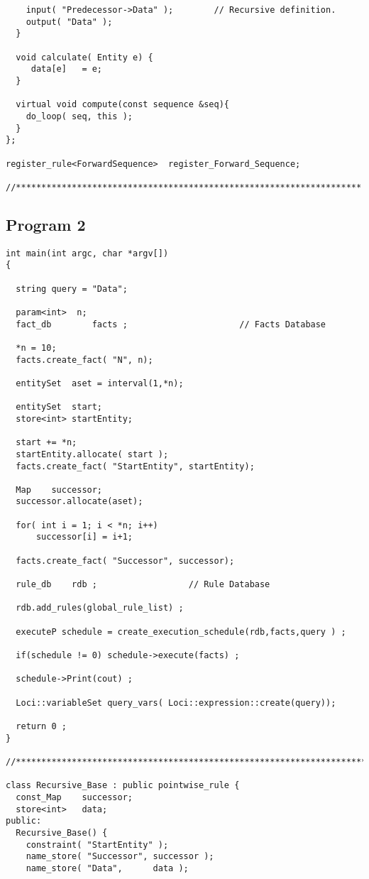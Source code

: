 \begin{verbatim}
    input( "Predecessor->Data" );        // Recursive definition.
    output( "Data" );
  }

  void calculate( Entity e) {
     data[e]   = e;
  }

  virtual void compute(const sequence &seq){
    do_loop( seq, this );
  }
};

register_rule<ForwardSequence>  register_Forward_Sequence;

//********************************************************************
\end{verbatim}

\subsection { Program 2 }

\begin{verbatim}
int main(int argc, char *argv[]) 
{
  
  string query = "Data";

  param<int>  n;
  fact_db        facts ;                      // Facts Database
  
  *n = 10;
  facts.create_fact( "N", n);

  entitySet  aset = interval(1,*n);

  entitySet  start;
  store<int> startEntity;

  start += *n;
  startEntity.allocate( start );
  facts.create_fact( "StartEntity", startEntity);

  Map    successor;
  successor.allocate(aset);

  for( int i = 1; i < *n; i++)
      successor[i] = i+1;

  facts.create_fact( "Successor", successor);

  rule_db    rdb ;                  // Rule Database
  
  rdb.add_rules(global_rule_list) ;

  executeP schedule = create_execution_schedule(rdb,facts,query ) ;

  if(schedule != 0) schedule->execute(facts) ;

  schedule->Print(cout) ;
  
  Loci::variableSet query_vars( Loci::expression::create(query));
  
  return 0 ;
}

//*********************************************************************

class Recursive_Base : public pointwise_rule {
  const_Map    successor;
  store<int>   data;
public:
  Recursive_Base() {
    constraint( "StartEntity" );
    name_store( "Successor", successor );
    name_store( "Data",      data );


\end{verbatim}
